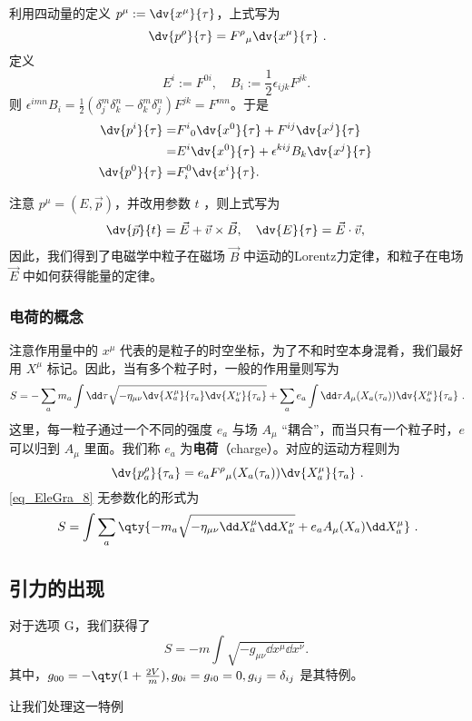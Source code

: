 利用四动量的定义 $p^\mu:=\dv{x^\mu}{\tau}$，上式写为
\begin{equation}
\dv{p^\rho}{\tau}={F^\rho}_{\mu}\dv{x^\mu}{\tau}~.
\end{equation}
定义
\begin{equation}
E^i:=F^{0i},\quad B_i:=\frac{1}{2}\epsilon_{ijk}F^{jk}.~
\end{equation}
则 $\epsilon^{imn}B_i=\frac{1}{2}(\delta^m_j\delta^{n}_k-\delta^m_k\delta^{n}_j)F^{jk}=F^{mn}$。于是
 \begin{equation}
 \begin{aligned}
  \dv{p^i}{\tau}=&{F^i}_{0}\dv{x^0}{\tau}+F^{ij}\dv{x^j}{\tau}\\
  =&{E^i}\dv{x^0}{\tau}+\epsilon^{kij}B_k\dv{x^j}{\tau}\\
  \dv{p^0}{\tau}=&F^{0}_i\dv{x^i}{\tau}.
 \end{aligned}~
 \end{equation}

 注意 $p^\mu=(E,\vec p)$，并改用参数 $t$ ，则上式写为
 \begin{equation}
 \dv{\vec p}{t}=\vec E+\vec v\times \vec B,\quad \dv{E}{\tau}=\vec E\cdot \vec v,~
 \end{equation}
 因此，我们得到了电磁学中粒子在磁场 $\vec B$ 中运动的Lorentz力定律，和粒子在电场 $\vec E$ 中如何获得能量的定律。

\subsubsection{电荷的概念}
注意作用量中的 $x^\mu$ 代表的是粒子的时空坐标，为了不和时空本身混肴，我们最好用 $X^\mu$ 标记。因此，当有多个粒子时，一般的作用量则写为
\begin{equation}\label{eq_EleGra_8}
S=-\sum_a m_a\int\dd \tau\sqrt{-\eta_{\mu\nu}\dv{X_a^\mu}{\tau_a}\dv{X_a^\nu}{\tau_a}}+\sum_a e_a\int\dd \tau A_\mu(X_a(\tau_a))\dv{X_a^\mu}{\tau_a}~.
\end{equation}
这里，每一粒子通过一个不同的强度 $e_a$ 与场 $A_\mu$ “耦合”，而当只有一个粒子时，$e$ 可以归到 $A_\mu$ 里面。我们称 $e_a$ 为\textbf{电荷}（charge）。对应的运动方程则为
\begin{equation}
\dv{p_a^\rho}{\tau_a}=e_a{F^\rho}_{\mu}(X_a(\tau_a))\dv{X_a^\mu}{\tau_a}~.
\end{equation}
\autoref{eq_EleGra_8} 无参数化的形式为
\begin{equation}
S=\int\sum_a \qty{-m_a\sqrt{-\eta_{\mu\nu}\dd X_a^\mu\dd X_a^\nu}+e_a A_\mu(X_a)\dd X_a^\mu}~.
\end{equation}

\subsection{引力的出现}
对于选项 G，我们获得了
\begin{equation}
S=-m\int\sqrt{-g_{\mu\nu}\dd x^\mu\dd x^\nu}.~
\end{equation}
其中，$g_{00}=-\qty(1+\frac{2V}{m}),g_{0i}=g_{i0}=0,g_{ij}=\delta_{ij}$ 是其特例。

让我们处理这一特例
\begin{equation}

\end{equation}








